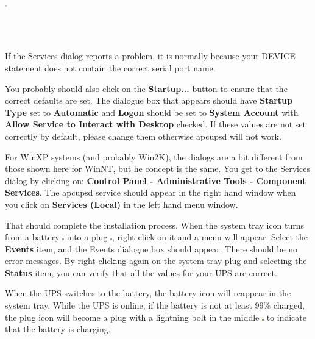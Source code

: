 \begin{itemize}
\begin{verbatim}
     
\end{verbatim}
\normalsize

\includegraphics{./wininstall6.eps}  

\footnotesize
\begin{verbatim}
     
     
\end{verbatim}
\normalsize

If the Services dialog reports a problem, it is normally because your DEVICE
statement does not contain the correct serial port name. 
\end{itemize}

You probably should also click on the {\bf Startup...} button to ensure that
the correct defaults are set. The dialogue box that appears should have {\bf
Startup Type} set to {\bf Automatic} and {\bf Logon} should be set to {\bf
System Account} with {\bf Allow Service to Interact with Desktop} checked. If
these values are not set correctly by default, please change them otherwise
apcupsd will not work.  

For WinXP systems (and probably Win2K), the dialogs are a bit different from
those shown here for WinNT, but he concept is the same. You get to the
Services dialog by clicking on: {\bf Control Panel -\gt{} Administrative Tools
-\gt{} Component Services}. The apcupsd service should appear in the right
hand window when you click on {\bf Services (Local)} in the left hand menu
window.  

That should complete the installation process. When the system tray icon turns
from a battery \includegraphics{./onbatt.eps} into a plug
\includegraphics{./online.eps}, right click on it and a menu will appear.
Select the {\bf Events} item, and the Events dialogue box should appear. There
should be no error messages. By right clicking again on the system tray plug
and selecting the {\bf Status} item, you can verify that all the values for
your UPS are correct.  

When the UPS switches to the battery, the battery icon will reappear in the
system tray. While the UPS is online, if the battery is not at least 99\%
charged, the plug icon will become a plug with a lightning bolt in the middle
\includegraphics{./charging.eps} to indicate that the battery is charging. 

